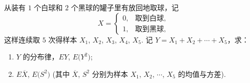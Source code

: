 	\begin{titwo}
		从装有 $1$ 个白球和 $2$ 个黑球的罐子里有放回地取球，记
		\[
			X = \begin{cases}
				0, & \text{取到白球}, \\
				1, & \text{取到黑球},
			\end{cases}
		\]
		这样连续取 $5$ 次得样本 $X_{1}$, $X_{2}$, $X_{3}$, $X_{4}$, $X_{5}$. 记 $Y = X_{1} + X_{2} + \cdots + X_{5}$，求：
		\begin{enumerate}
			\item $Y$ 的分布律，$EY$, $E\bigl( Y^{2} \bigr)$;
			\item $E\overline{X}$, $E\bigl( S^{2} \bigr)$ (其中 $\overline{X}$, $S^{2}$ 分别为样本 $X_{1}$, $X_{2}$, $\cdots$, $X_{5}$ 的均值与方差).
		\end{enumerate}
	\end{titwo}